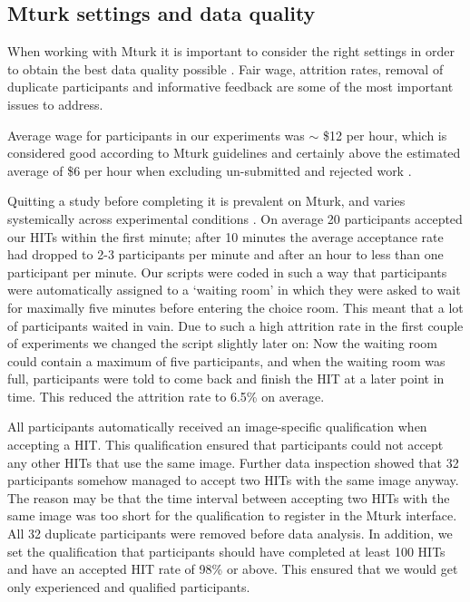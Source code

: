 \documentclass[9pt,a4paper,twocolumn,lineno]{article}
\begin{document}
\subsection*{Mturk settings and data quality}
When working with Mturk it is important to consider the right settings in order to obtain the best data quality possible \cite{chandler2016conducting}. Fair wage, attrition rates, removal of duplicate participants and informative feedback are some of the most important issues to address.

Average wage for participants in our experiments was $\sim$ \$12 per hour, which is considered good according to Mturk guidelines and certainly above the estimated average of \$6 per hour when excluding un-submitted and rejected work \cite{hara2018data}.

Quitting a study before completing it is prevalent on Mturk, and varies systemically across experimental conditions \cite{zhou2016pitfall}. On average 20 participants accepted our HITs within the first minute; after 10 minutes the average acceptance rate had dropped to 2-3 participants per minute and after an hour to less than one participant per minute. Our scripts were coded in such a way that participants were automatically assigned to a ‘waiting room’ in which they were asked to wait for maximally five minutes before entering the choice room. This meant that a lot of participants waited in vain. Due to such a high attrition rate in the first couple of experiments we changed the script slightly later on: Now the waiting room could contain a maximum of five participants, and when the waiting room was full, participants were told to come back and finish the HIT at a later point in time. This reduced the attrition rate to 6.5\% on average.

All participants automatically received an image-specific qualification when accepting a HIT. This qualification ensured that participants could not accept any other HITs that use the same image. Further data inspection showed that 32 participants somehow managed to accept two HITs with the same image anyway. The reason may be that the time interval between accepting two HITs with the same image was too short for the qualification to register in the Mturk interface. All 32 duplicate participants were removed before data analysis. In addition, we set the qualification that participants should have completed at least 100 HITs and have an accepted HIT rate of 98\% or above. This ensured that we would get only experienced and qualified participants.
\end{document}
